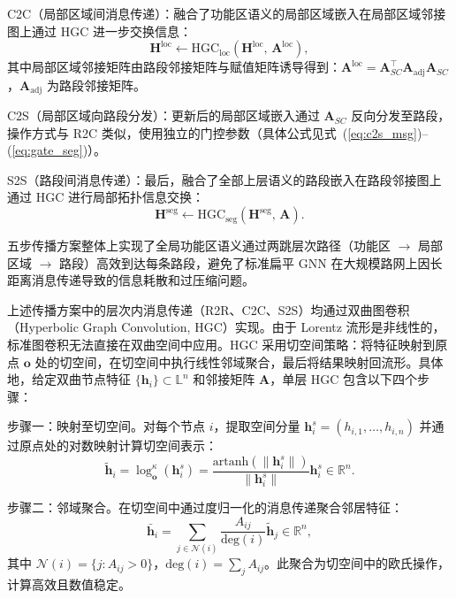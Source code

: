 C2C（局部区域间消息传递）：融合了功能区语义的局部区域嵌入在局部区域邻接图上通过 HGC 进一步交换信息：
\begin{equation}
    \mathbf{H}^{\text{loc}} \leftarrow \text{HGC}_{\text{loc}}\!\left(\mathbf{H}^{\text{loc}},\, \mathbf{A}^{\text{loc}}\right),
    \label{eq:c2c}
\end{equation}
其中局部区域邻接矩阵由路段邻接矩阵与赋值矩阵诱导得到：$\mathbf{A}^{\text{loc}} = \mathbf{A}_{SC}^\top \mathbf{A}_{\text{adj}} \mathbf{A}_{SC}$，$\mathbf{A}_{\text{adj}}$ 为路段邻接矩阵。

C2S（局部区域向路段分发）：更新后的局部区域嵌入通过 $\mathbf{A}_{SC}$ 反向分发至路段，操作方式与 R2C 类似，使用独立的门控参数（具体公式见式~(\ref{eq:c2s_msg})--(\ref{eq:gate_seg})）。

S2S（路段间消息传递）：最后，融合了全部上层语义的路段嵌入在路段邻接图上通过 HGC 进行局部拓扑信息交换：
\begin{equation}
    \mathbf{H}^{\text{seg}} \leftarrow \text{HGC}_{\text{seg}}\!\left(\mathbf{H}^{\text{seg}},\, \mathbf{A}\right).
    \label{eq:s2s}
\end{equation}

五步传播方案整体上实现了全局功能区语义通过两跳层次路径（功能区 $\to$ 局部区域 $\to$ 路段）高效到达每条路段，避免了标准扁平 GNN 在大规模路网上因长距离消息传递导致的信息耗散和过压缩问题\cite{topping2022oversquashing}。

上述传播方案中的层次内消息传递（R2R、C2C、S2S）均通过双曲图卷积（Hyperbolic Graph Convolution, HGC）实现。由于 Lorentz 流形是非线性的，标准图卷积无法直接在双曲空间中应用。HGC\cite{chami2019hgcn,liu2019hgnn} 采用切空间策略：将特征映射到原点 $\mathbf{o}$ 处的切空间，在切空间中执行线性邻域聚合，最后将结果映射回流形。具体地，给定双曲节点特征 $\{\mathbf{h}_i\} \subset \mathbb{L}^n$ 和邻接矩阵 $\mathbf{A}$，单层 HGC 包含以下四个步骤：

步骤一：映射至切空间。对每个节点 $i$，提取空间分量 $\mathbf{h}_i^s = (h_{i,1}, \dots, h_{i,n})$ 并通过原点处的对数映射计算切空间表示：
\begin{equation}
    \tilde{\mathbf{h}}_i = \log_{\mathbf{o}}^{\kappa}(\mathbf{h}_i^s)
    = \frac{\text{artanh}(\|\mathbf{h}_i^s\|)}{\|\mathbf{h}_i^s\|} \mathbf{h}_i^s
    \in \mathbb{R}^{n}.
    \label{eq:hgc_log}
\end{equation}

步骤二：邻域聚合。在切空间中通过度归一化的消息传递聚合邻居特征：
\begin{equation}
    \bar{\mathbf{h}}_i = \sum_{j \in \mathcal{N}(i)} \frac{A_{ij}}{\text{deg}(i)} \tilde{\mathbf{h}}_j
    \in \mathbb{R}^{n},
    \label{eq:hgc_agg}
\end{equation}
其中 $\mathcal{N}(i) = \{j : A_{ij} > 0\}$，$\text{deg}(i) = \sum_j A_{ij}$。此聚合为切空间中的欧氏操作，计算高效且数值稳定。


